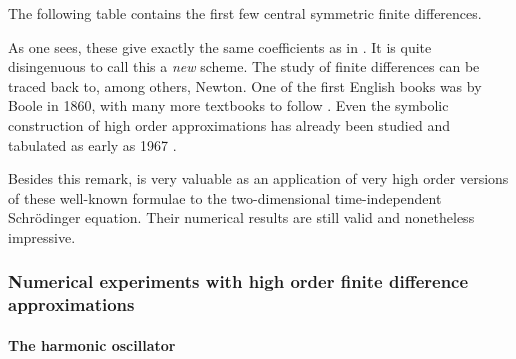 The following table contains the first few central symmetric finite differences.
\begin{center}
    
\end{center}

As one sees, these give exactly the same coefficients as in \cite{wang_new_2009}. It is quite disingenuous to call this a \emph{new} scheme. The study of finite differences can be traced back to, among others, Newton. One of the first English books was by Boole \cite{boole_calculus_1860} in 1860, with many more textbooks to follow \cite{thomson_calculus_1933,jordan_calculus_1965}. Even the symbolic construction of high order approximations has already been studied and tabulated as early as 1967 \cite{ballester_construction_1967,keller_symbolic_1978,fornberg_generation_1988}.

Besides this remark, \cite{wang_new_2009} is very valuable as an application of very high order versions of these well-known formulae to the two-dimensional time-independent Schrödinger equation. Their numerical results are still valid and nonetheless impressive.

\subsubsection{Numerical experiments with high order finite difference approximations}\label{sec:c4_fd_numerical}

\paragraph{The harmonic oscillator}

